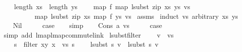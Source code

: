 \begin{isabellebody}
\ \ \ \ {\isachardoublequoteopen}length\ xs\ {\isacharequal}{\kern0pt}\ length\ ys{\isachardoublequoteclose}\isanewline
\ \ \ \ {\isachardoublequoteopen}map\ f\ {\isacharparenleft}{\kern0pt}map\ {\isacharparenleft}{\kern0pt}lsubst\ {\isacharparenleft}{\kern0pt}zip\ xs\ ys{\isacharparenright}{\kern0pt}{\isacharparenright}{\kern0pt}\ vs{\isacharparenright}{\kern0pt}\ {\isacharequal}{\kern0pt}\isanewline
\ \ \ \ \ \ \ \ \ \ map\ {\isacharparenleft}{\kern0pt}lsubst\ {\isacharparenleft}{\kern0pt}zip\ xs\ {\isacharparenleft}{\kern0pt}map\ f\ ys{\isacharparenright}{\kern0pt}{\isacharparenright}{\kern0pt}{\isacharparenright}{\kern0pt}\ vs{\isachardoublequoteclose}\isanewline
%
\isadelimproof
%
\endisadelimproof
%
\isatagproof
{}\isamarkupfalse%
\ assms\isanewline
{}\isamarkupfalse%
\ {\isacharparenleft}{\kern0pt}induct\ vs\ arbitrary{\isacharcolon}{\kern0pt}\ xs\ ys{\isacharparenright}{\kern0pt}\isanewline
\ \ \isamarkupfalse%
\ Nil\isanewline
\ \ \isamarkupfalse%
\ \isamarkupfalse%
\ {\isacharquery}{\kern0pt}case\isanewline
\ \ \isamarkupfalse%
\ simp\isanewline
{}\isamarkupfalse%
\isanewline
\ \ \isamarkupfalse%
\ {\isacharparenleft}{\kern0pt}Cons\ a\ vs{\isacharparenright}{\kern0pt}\isanewline
\ \ \isamarkupfalse%
\ \isamarkupfalse%
\ {\isacharquery}{\kern0pt}case\isanewline
\ \ \isamarkupfalse%
\ {\isacharparenleft}{\kern0pt}simp\ add{\isacharcolon}{\kern0pt}\ lmap{\isacharunderscore}{\kern0pt}lmap{\isacharunderscore}{\kern0pt}commute{\isacharunderscore}{\kern0pt}link{\isacharparenright}{\kern0pt}\isanewline
{}\isamarkupfalse%
%
\endisatagproof
{\isafoldproof}%
%
\isadelimproof
\isanewline
%
\endisadelimproof
\isanewline
\isanewline
{}\isamarkupfalse%
\ lsubst{\isacharunderscore}{\kern0pt}filter{\isacharcolon}{\kern0pt}\isanewline
\ \ \ \ {\isachardoublequoteopen}v\ {\isasymin}\ vs{\isachardoublequoteclose}\isanewline
\ \ \ \ {\isachardoublequoteopen}s{}\ {\isacharequal}{\kern0pt}\ filter\ {\isacharparenleft}{\kern0pt}{\isasymlambda}{\isacharparenleft}{\kern0pt}x{\isacharcomma}{\kern0pt}y{\isacharparenright}{\kern0pt}{\isachardot}{\kern0pt}\ x\ {\isasymin}\ vs{\isacharparenright}{\kern0pt}\ s{\isachardoublequoteclose}\isanewline
\ \ \ \ {\isachardoublequoteopen}lsubst\ s\ v\ {\isacharequal}{\kern0pt}\ lsubst\ s{}\ v{\isachardoublequoteclose}\isanewline

\end{isabellebody}
